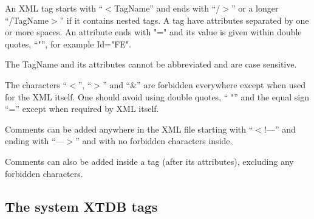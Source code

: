 \documentclass{article}
\begin{document}
An XML tag starts with ``$<$TagName'' and ends with ``/$>$'' or a
longer ``/TagName$>$'' if it contains nested tags.  A tag have
attributes separated by one or more spaces.  An attribute ends with
"=" and its value is given within double quotes, ``"'', for example
Id="FE".

The TagName and its attributes cannot be abbreviated and are case
sensitive.

The characters ``$<$'', ``$>$''  and ``\&'' are forbidden everywhere
except when used for the XML itself.  One should avoid using double
quotes, `` "'' and the equal sign ``='' except when required by XML
itself.

Comments can be added anywhere in the XML file starting with ``$<$!---''
and ending with ``---$>$'' and with no forbidden characters inside.

Comments can also be added inside a tag (after its attributes),
excluding any forbidden characters.

\newpage

\subsection{The system XTDB tags}
\end{document}
